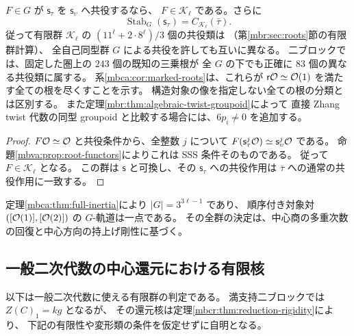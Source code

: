 \begin{corollary}[全 $\OO$-同値は既知の共役類を融合しない]
\label{mbva:cor:root-orbits}
$F\in G$ が $\mathsf s_\tau$ を $\mathsf s_\upsilon$ へ共役するなら、
$F\in\mathcal K_\ell$ である。さらに
\[
 \operatorname{Stab}_{G}(\mathsf s_\tau)
       =C_{\mathcal K_\ell}(\bar\tau).
\]
従って有限群 $\mathcal K_\ell$ の
$(11^\ell+2\cdot8^\ell)/3$ 個の共役類は
（第\ref{mbr:sec:roots}節の有限群計算）、
全自己同型群 $G$ による共役を許しても互いに異なる。
二ブロックでは、固定した圏上の $243$ 個の既知の三乗根が
全 $G$ の下でも正確に $83$ 個の異なる共役類に属する。
系\ref{mbca:cor:marked-roots}は、これらが
$\mathsf r\mathcal O\simeq\mathcal O(1)$ を満たす全ての根を尽くすことを示す。
構造対象の像を指定しない全ての根の分類とは区別する。
また定理\ref{mbr:thm:algebraic-twist-groupoid}によって
直接 Zhang twist 代数の同型 groupoid と比較する場合には、$6p_i\ne0$ を追加する。
\end{corollary}
\begin{proof}
$F\mathcal O\simeq\mathcal O$ と共役条件から、全整数 $j$ について
$F(\mathsf s_\tau^j\mathcal O)\simeq\mathsf s_\upsilon^j\mathcal O$ である。
命題\ref{mbva:prop:root-functors}によりこれは SSS 条件そのものである。
従って $F\in\mathcal K_\ell$ となる。
この群は $\mathsf s$ と可換し、その $\mathsf s_\tau$ への共役作用は
$\bar\tau$ への通常の共役作用に一致する。
\end{proof}

定理\ref{mbca:thm:full-inertia}により $|G|=3^{3\ell-1}$ であり、
順序付き対象対 $([\mathcal O(1)],[\mathcal O(2)])$ の $G$-軌道は一点である。
その全群の決定は、中心商の多重次数の回復と中心方向の持上げ剛性に基づく。

\subsection{一般二次代数の中心還元における有限核}

以下は一般二次代数に使える有限群の判定である。
満支持二ブロックでは $Z(C)_1=kg$ となるが、
その還元核は定理\ref{mbcr:thm:reduction-rigidity}により、
下記の有限性や変形類の条件を仮定せずに自明となる。

